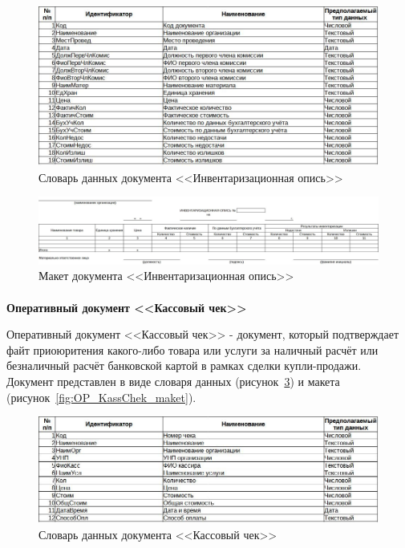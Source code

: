 \documentclass[12pt, a4paper, simple]{eskdtext}
\begin{document}
    \begin{figure}[!h]
        \centering
        \includegraphics[width=14cm]
            {_docs/ОП_ИнвенОпис_типы.jpg}
        \caption{Словарь данных документа <<Инвентаризационная опись>>}
        \label{fig:OP_InvenOpis_tipi}
    \end{figure}

    \begin{figure}[!h]
        \centering
        \includegraphics[width=14cm]
            {_docs/ОП_ИнвенОпис_макет.jpg}
        \caption{Макет документа <<Инвентаризационная опись>>}
        \label{fig:OP_InvenOpis_maket}
    \end{figure}

    \newpage
    \paragraph{} \textbf{Оперативный документ <<Кассовый чек>>}

    Оперативный документ <<Кассовый чек>>
    - документ, который подтверждает файт приоюритения какого-либо товара или услуги
    за наличный расчёт или безналичный расчёт банковской картой
    в рамках сделки купли-продажи.
    Документ представлен в виде словаря данных (рисунок~\ref{fig:OP_KassChek_tipi})
    и макета (рисунок~\ref{fig:OP_KassChek_maket}).

    \begin{figure}[!h]
        \centering
        \includegraphics[width=14cm]
            {_docs/ОП_КассЧек_типы.jpg}
        \caption{Словарь данных документа <<Кассовый чек>>}
        \label{fig:OP_KassChek_tipi}
    \end{figure}
\end{document}
